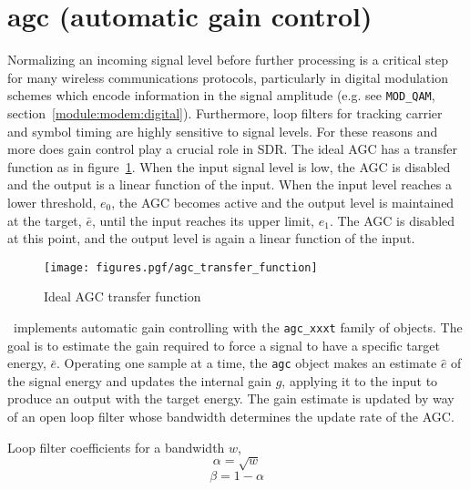 % 
%

\section{agc (automatic gain control)}
\label{module:agc}
Normalizing an incoming signal level before further processing is a critical
step for many wireless communications protocols, particularly in digital
modulation schemes which encode information in the signal amplitude (e.g. see
{\tt MOD\_QAM}, section~\ref{module:modem:digital}).
Furthermore, loop filters for tracking carrier and symbol timing are highly
sensitive to signal levels.
For these reasons and more does gain control play a crucial role in SDR.
The ideal AGC has a transfer function as in
figure~\ref{fig:module:agc:transfer_function}.
When the input signal level is low, the AGC is disabled and the output is a
linear function of the input.
When the input level reaches a lower threshold, $e_0$, the AGC becomes active
and the output level is maintained at the target, $\bar{e}$, until the input
reaches its upper limit, $e_1$.
The AGC is disabled at this point, and the output level is again a linear
function of the input.

\begin{figure}
\centering
  \texttt{[image: figures.pgf/agc\_transfer\_function]}
\caption{Ideal AGC transfer function}
\label{fig:module:agc:transfer_function}
\end{figure}


\liquid\ implements automatic gain controlling with the {\tt agc\_xxxt}
family of objects.
The goal is to estimate the gain required to force a signal to have a specific
target energy, $\bar{e}$.
Operating one sample at a time, the {\tt agc} object makes an estimate
$\hat{e}$ of the signal energy and updates the internal gain $\hat{g}$,
applying it to the input to produce an output with the target energy.
The gain estimate is updated by way of an open loop filter whose bandwidth
determines the update rate of the AGC.

Loop filter coefficients for a bandwidth $w$,
\[  \alpha = \sqrt{w}   \]
\[  \beta = 1 - \alpha  \]

